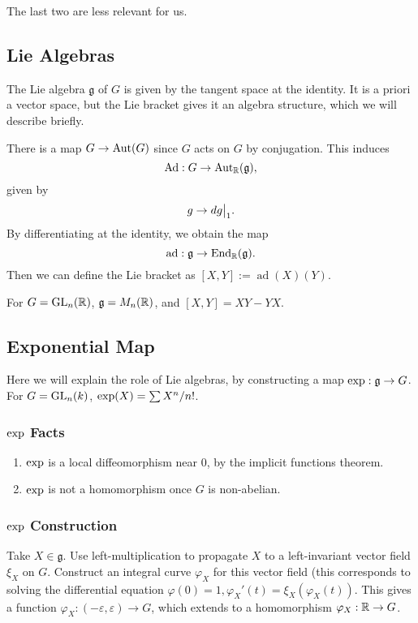 The last two are less relevant for us.

\subsection{Lie Algebras}
The Lie algebra $\mathfrak{g}$ of $G$ is given by the tangent space at the 
identity. It is a priori a vector space, but the Lie bracket gives it an algebra
structure, which we will describe briefly.

There is a map $G \rightarrow \operatorname{Aut}(G)$ since $G$ acts on $G$ by conjugation.
This induces \[ \operatorname{Ad}: G \rightarrow \operatorname{Aut}_{\mathbb{R}} (\mathfrak{g}), \]
given by \[ g \rightarrow \restr{dg}{1}.\] By differentiating at the identity,
we obtain the map
\[ \operatorname{ad}: \mathfrak{g} \rightarrow \operatorname{End}_{\mathbb{R}}(\mathfrak{g}). \]
Then we can define the Lie bracket as $[X, Y] := \operatorname{ad}(X)(Y)$.

\begin{exmpl}
For $G = \mathrm{GL}_{n}({\mathbb{R}})$, $\mathfrak{g} = M_n(\mathbb{R})$, and $[X, Y] = XY - YX$.
\end{exmpl}

\subsection{Exponential Map}

Here we will explain the role of Lie algebras, by constructing a map
$\operatorname{exp} : \mathfrak{g} \rightarrow G$. For $G = \mathrm{GL}_{n}({k})$,
$\operatorname{exp}(X) = \sum X^n / n!$.

\subsubsection{$\operatorname{exp}$ Facts}

\begin{enumerate}[1.]
\item $\operatorname{exp}$ is a local diffeomorphism near 0, by the implicit functions
theorem.
\item $\operatorname{exp}$ is not a homomorphism once $G$ is non-abelian.
\end{enumerate}

\subsubsection{$\operatorname{exp}$ Construction}
Take $X \in \mathfrak{g}$. Use left-multiplication to propagate $X$ to a
left-invariant vector field $\xi_X$ on $G$. Construct an integral curve 
$\varphi_X$ for this vector field (this corresponds to solving the differential 
equation $\varphi(0) = 1, \varphi_X'(t) = \xi_X(\varphi_X(t))$. This gives a 
function $\varphi_X : (-\varepsilon, \varepsilon) \rightarrow G$, which extends 
to a homomorphism $\varphi_X : \mathbb{R} \rightarrow G$.

